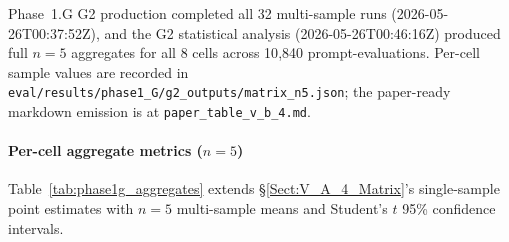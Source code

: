 \documentclass[journal]{IEEEtran}
\begin{document}
Phase~1.G G2 production completed all 32 multi-sample runs (2026-05-26T00:37:52Z), and the G2 statistical analysis (2026-05-26T00:46:16Z) produced full $n{=}5$ aggregates for all 8 cells across 10{,}840 prompt-evaluations. Per-cell sample values are recorded in \texttt{eval/results/phase1\_G/g2\_outputs/matrix\_n5.json}; the paper-ready markdown emission is at \texttt{paper\_table\_v\_b\_4.md}.

\paragraph{Per-cell aggregate metrics ($n{=}5$)}
Table~\ref{tab:phase1g_aggregates} extends \S\ref{Sect:V_A_4_Matrix}'s single-sample point estimates with $n{=}5$ multi-sample means and Student's $t$ 95\% confidence intervals.

\begin{table}[!t]
    \centering
    \caption{Phase 1.G G2 production: per-cell aggregate metrics, $n{=}5$ samples per cell. CI = Student's $t$ 95\% confidence interval, $t_{0.025,4}{=}2.776$. Bypass\% CI half-width is 0.0000 in every cell because the pre-LLM gate stage is deterministic by construction (see \S\ref{Sect:V_B_5_4_S19}, finding S19). The bge-large $\times$ 60 ULR CI half-width (0.0021) reflects a single non-zero observation in sample 3 forensically classified as a measurement-stage false positive (\S\ref{Sect:V_B_5_1_S15}, finding S15).}
    \label{tab:phase1g_aggregates}
\end{table}
\end{document}

